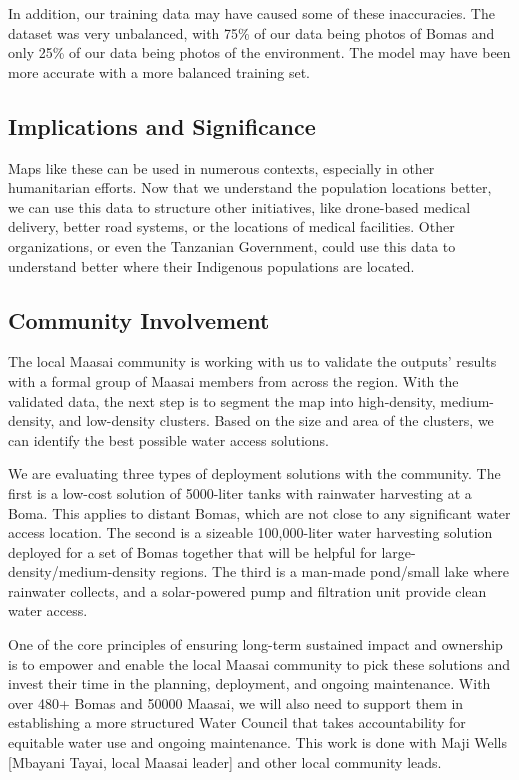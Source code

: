 \documentclass[10pt]{article}
\begin{document}
In addition, our training data may have caused some of these inaccuracies. The dataset was very unbalanced, with 75\% of our data being photos of Bomas and only 25\% of our data being photos of the environment. The model may have been more accurate with a more balanced training set.

\subsection{Implications and Significance}

Maps like these can be used in numerous contexts, especially in other humanitarian efforts. Now that we understand the population locations better, we can use this data to structure other initiatives, like drone-based medical delivery, better road systems, or the locations of medical facilities. Other organizations, or even the Tanzanian Government, could use this data to understand better where their Indigenous populations are located.

\subsection{Community Involvement}

The local Maasai community is working with us to validate the outputs' results with a formal group of Maasai members from across the region. With the validated data, the next step is to segment the map into high-density, medium-density, and low-density clusters. Based on the size and area of the clusters, we can identify the best possible water access solutions.

We are evaluating three types of deployment solutions with the community. The first is a low-cost solution of 5000-liter tanks with rainwater harvesting at a Boma. This applies to distant Bomas, which are not close to any significant water access location. The second is a sizeable 100,000-liter water harvesting solution deployed for a set of Bomas together that will be helpful for large-density/medium-density regions. The third is a man-made pond/small lake where rainwater collects, and a solar-powered pump and filtration unit provide clean water access.

One of the core principles of ensuring long-term sustained impact and ownership is to empower and enable the local Maasai community to pick these solutions and invest their time in the planning, deployment, and ongoing maintenance. With over 480+ Bomas and 50000 Maasai, we will also need to support them in establishing a more structured Water Council that takes accountability for equitable water use and ongoing maintenance. This work is done with Maji Wells [Mbayani Tayai, local Maasai leader] and other local community leads.
\end{document}
